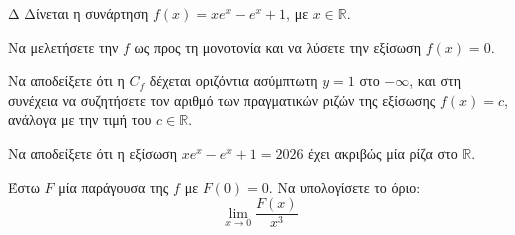 \begin{thema}{Δ}
Δίνεται η συνάρτηση $f(x) = x e^x - e^x + 1$, με $x \in \mathbb{R}$.
\begin{erwthma}
    \item Να μελετήσετε την $f$ ως προς τη μονοτονία και να λύσετε την εξίσωση $f(x) = 0$.
    \item Να αποδείξετε ότι η $C_f$ δέχεται οριζόντια ασύμπτωτη $y = 1$ στο $-\infty$, και στη συνέχεια να συζητήσετε τον αριθμό των πραγματικών ριζών της εξίσωσης $f(x) = c$, ανάλογα με την τιμή του $c \in \mathbb{R}$.
    \item Να αποδείξετε ότι η εξίσωση $x e^x - e^x + 1 = 2026$ έχει ακριβώς μία ρίζα στο $\mathbb{R}$.
    \item Έστω $F$ μία παράγουσα της $f$ με $F(0) = 0$. Να υπολογίσετε το όριο:
    \[ \lim_{x \to 0} \frac{F(x)}{x^3} \]
\end{erwthma}
\end{thema}
